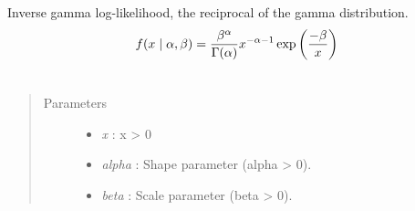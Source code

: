 \documentclass[letterpaper,10pt,english]{sphinxmanual}
\begin{document}
\begin{fulllineitems}
\label{distributions:pymc.distributions.inverse_gamma_like}
Inverse gamma log-likelihood, the reciprocal of the gamma distribution.
\begin{gather}
\begin{split}f(x \mid \alpha, \beta) = \frac{\beta^{\alpha}}{\Gamma(\alpha)} x^{-\alpha - 1} \exp\left(\frac{-\beta}{x}\right)\end{split}\notag\\\begin{split}\end{split}\notag
\end{gather}\begin{quote}\begin{description}
\item[{Parameters }] \leavevmode\begin{itemize}
\item {} 
\emph{x} : x \textgreater{} 0

\item {} 
\emph{alpha} : Shape parameter (alpha \textgreater{} 0).

\item {} 
\emph{beta} : Scale parameter (beta \textgreater{} 0).

\end{itemize}

\end{description}\end{quote}

\end{fulllineitems}

\end{document}
